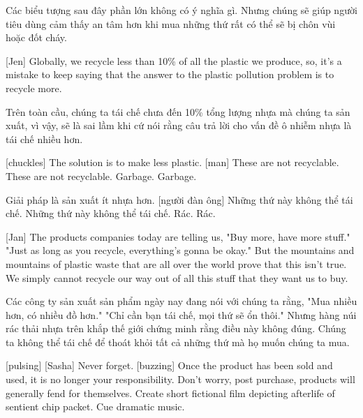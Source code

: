 \documentclass[a4paper]{article}
\begin{document}
	\begin{vietnamese-v2}
		Các biểu tượng sau đây phần lớn không có ý nghĩa gì.
		Nhưng chúng sẽ giúp người tiêu dùng cảm thấy an tâm hơn khi mua những thứ rất có thể sẽ bị chôn vùi hoặc đốt cháy.
	\end{vietnamese-v2}
	
	[Jen] Globally, we recycle less than 10\% of all the plastic we produce, so, it's a mistake to keep saying that the answer to the plastic pollution problem is to recycle more.
	
	\begin{vietnamese-v2}
		[Jen] Trên toàn cầu, chúng ta tái chế chưa đến 10\% tổng lượng nhựa mà chúng ta sản xuất, vì vậy, sẽ là sai lầm khi cứ nói rằng câu trả lời cho vấn đề ô nhiễm nhựa là tái chế nhiều hơn.
	\end{vietnamese-v2}
	
	[chuckles] The solution is to make less plastic.
	[man] These are not recyclable.
	These are not recyclable. Garbage. Garbage.
	
	\begin{vietnamese-v2}
		 Giải pháp là sản xuất ít nhựa hơn.
		[người đàn ông] Những thứ này không thể tái chế.
		Những thứ này không thể tái chế. Rác. Rác.
	\end{vietnamese-v2}
	
	[Jan] The products companies today are telling us,
	"Buy more, have more stuff."
	"Just as long as you recycle, everything's gonna be okay."
	But the mountains and mountains of plastic waste that are all over the world prove that this isn't true.
	We simply cannot recycle our way out of all this stuff that they want us to buy.
	
	\begin{vietnamese-v2}
		[Jan] Các công ty sản xuất sản phẩm ngày nay đang nói với chúng ta rằng,
		"Mua nhiều hơn, có nhiều đồ hơn."
		"Chỉ cần bạn tái chế, mọi thứ sẽ ổn thôi."
		Nhưng hàng núi rác thải nhựa trên khắp thế giới chứng minh rằng điều này không đúng.
		Chúng ta không thể tái chế để thoát khỏi tất cả những thứ mà họ muốn chúng ta mua.
	\end{vietnamese-v2}
	
	
	[pulsing]
	[Sasha] Never forget.
	[buzzing]
	Once the product has been sold and used, it is no longer your responsibility.
	Don't worry, post purchase, products will generally fend for themselves.
	Create short fictional film depicting afterlife of sentient chip packet.
	Cue dramatic music.
	
\end{document}
